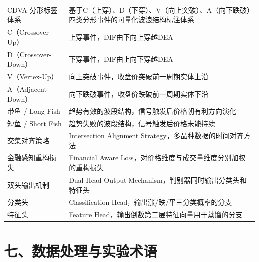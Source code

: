 \begin{longtable}{>{\raggedright\arraybackslash}p{4.5cm} p{9.5cm}}
CDVA 分形标签体系 & 基于C（上穿）、D（下穿）、V（向上突破）、A（向下跌破）四类分形事件的可量化波浪结构标注体系 \\
C（Crossover-Up） & 上穿事件，DIF由下向上穿越DEA \\
D（Crossover-Down） & 下穿事件，DIF由上向下穿越DEA \\
V（Vertex-Up） & 向上突破事件，收盘价突破前一周期实体上沿 \\
A（Adjacent-Down） & 向下跌破事件，收盘价跌破前一周期实体下沿 \\
带鱼 / Long Fish & 趋势有效的波段结构，信号触发后价格朝有利方向演化 \\
短鱼 / Short Fish & 趋势失败的波段结构，信号触发后价格未能持续 \\
交集对齐策略 & Intersection Alignment Strategy，多品种数据的时间对齐方法 \\
金融感知重构损失 & Financial Aware Loss，对价格维度与成交量维度分别加权的重构损失 \\
双头输出机制 & Dual-Head Output Mechanism，判别器同时输出分类头和特征头 \\
分类头 & Classification Head，输出涨/跌/平三分类概率的分支 \\
特征头 & Feature Head，输出倒数第二层特征向量用于蒸馏的分支 \\
\end{longtable}

\section*{七、数据处理与实验术语}

